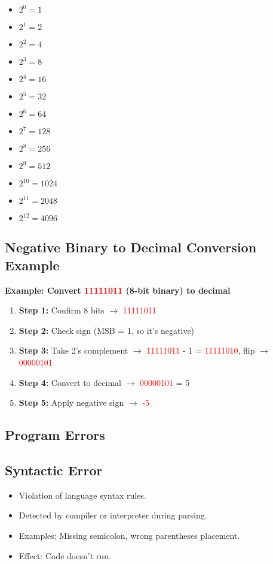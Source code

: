 \begin{itemize}
    \item $2^0 = 1$
    \item $2^1 = 2$
    \item $2^2 = 4$
    \item $2^3 = 8$
    \item $2^4 = 16$
    \item $2^5 = 32$
    \item $2^6 = 64$
    \item $2^7 = 128$
    \item $2^8 = 256$
    \item $2^9 = 512$
    \item $2^{10} = 1024$
    \item $2^{11} = 2048$
    \item $2^{12} = 4096$
\end{itemize}

\subsection{Negative Binary to Decimal Conversion Example}

\textbf{Example: Convert \textcolor{red}{11111011} (8-bit binary) to decimal}

\begin{enumerate}
    \item \textbf{Step 1:} Confirm 8 bits $\rightarrow$ \textcolor{red}{11111011}
    \item \textbf{Step 2:} Check sign (MSB = 1, so it's negative)
    \item \textbf{Step 3:} Take 2's complement $\rightarrow$ \textcolor{red}{11111011} - 1 = \textcolor{red}{11111010}, flip $\rightarrow$ \textcolor{red}{00000101}
    \item \textbf{Step 4:} Convert to decimal $\rightarrow$ \textcolor{red}{00000101} = 5
    \item \textbf{Step 5:} Apply negative sign $\rightarrow$ \textcolor{red}{-5}
\end{enumerate}

\subsection{Program Errors}
\subsection{Syntactic Error}
\begin{itemize}
    \item Violation of language syntax rules.
    \item Detected by compiler or interpreter during parsing.
    \item Examples: Missing semicolon, wrong parentheses placement.
    \item Effect: Code doesn’t run.
\end{itemize}

